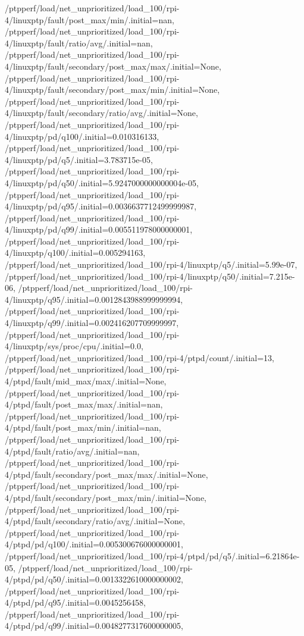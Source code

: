 {    /ptpperf/load/net_unprioritized/load_100/rpi-4/linuxptp/fault/post_max/min/.initial=nan,
    /ptpperf/load/net_unprioritized/load_100/rpi-4/linuxptp/fault/ratio/avg/.initial=nan,
    /ptpperf/load/net_unprioritized/load_100/rpi-4/linuxptp/fault/secondary/post_max/max/.initial=None,
    /ptpperf/load/net_unprioritized/load_100/rpi-4/linuxptp/fault/secondary/post_max/min/.initial=None,
    /ptpperf/load/net_unprioritized/load_100/rpi-4/linuxptp/fault/secondary/ratio/avg/.initial=None,
    /ptpperf/load/net_unprioritized/load_100/rpi-4/linuxptp/pd/q100/.initial=0.010316133,
    /ptpperf/load/net_unprioritized/load_100/rpi-4/linuxptp/pd/q5/.initial=3.783715e-05,
    /ptpperf/load/net_unprioritized/load_100/rpi-4/linuxptp/pd/q50/.initial=5.9247000000000004e-05,
    /ptpperf/load/net_unprioritized/load_100/rpi-4/linuxptp/pd/q95/.initial=0.0036637712499999987,
    /ptpperf/load/net_unprioritized/load_100/rpi-4/linuxptp/pd/q99/.initial=0.005511978000000001,
    /ptpperf/load/net_unprioritized/load_100/rpi-4/linuxptp/q100/.initial=0.005294163,
    /ptpperf/load/net_unprioritized/load_100/rpi-4/linuxptp/q5/.initial=5.99e-07,
    /ptpperf/load/net_unprioritized/load_100/rpi-4/linuxptp/q50/.initial=7.215e-06,
    /ptpperf/load/net_unprioritized/load_100/rpi-4/linuxptp/q95/.initial=0.0012843988999999994,
    /ptpperf/load/net_unprioritized/load_100/rpi-4/linuxptp/q99/.initial=0.002416207709999997,
    /ptpperf/load/net_unprioritized/load_100/rpi-4/linuxptp/sys/proc/cpu/.initial=0.0,
    /ptpperf/load/net_unprioritized/load_100/rpi-4/ptpd/count/.initial=13,
    /ptpperf/load/net_unprioritized/load_100/rpi-4/ptpd/fault/mid_max/max/.initial=None,
    /ptpperf/load/net_unprioritized/load_100/rpi-4/ptpd/fault/post_max/max/.initial=nan,
    /ptpperf/load/net_unprioritized/load_100/rpi-4/ptpd/fault/post_max/min/.initial=nan,
    /ptpperf/load/net_unprioritized/load_100/rpi-4/ptpd/fault/ratio/avg/.initial=nan,
    /ptpperf/load/net_unprioritized/load_100/rpi-4/ptpd/fault/secondary/post_max/max/.initial=None,
    /ptpperf/load/net_unprioritized/load_100/rpi-4/ptpd/fault/secondary/post_max/min/.initial=None,
    /ptpperf/load/net_unprioritized/load_100/rpi-4/ptpd/fault/secondary/ratio/avg/.initial=None,
    /ptpperf/load/net_unprioritized/load_100/rpi-4/ptpd/pd/q100/.initial=0.005300676000000001,
    /ptpperf/load/net_unprioritized/load_100/rpi-4/ptpd/pd/q5/.initial=6.21864e-05,
    /ptpperf/load/net_unprioritized/load_100/rpi-4/ptpd/pd/q50/.initial=0.0013322610000000002,
    /ptpperf/load/net_unprioritized/load_100/rpi-4/ptpd/pd/q95/.initial=0.0045256458,
    /ptpperf/load/net_unprioritized/load_100/rpi-4/ptpd/pd/q99/.initial=0.0048277317600000005,
}
